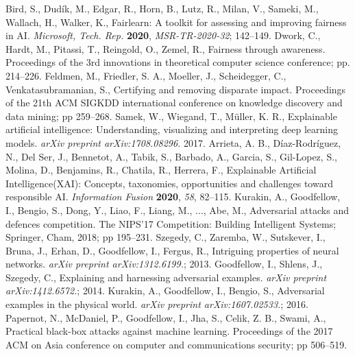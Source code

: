 \documentclass[journal,article,submit,moreauthors,pdftex]{Definitions/mdpi}
\begin{document}
\begin{thebibliography}{999}
Bird, S., Dudík, M., Edgar, R., Horn, B., Lutz, R., Milan, V., Sameki, M., Wallach, H., Walker, K., Fairlearn: A toolkit for assessing and improving fairness in AI. {\em Microsoft, Tech. Rep.} {\bf 2020}, {\em MSR-TR-2020-32}; 142--149.
Dwork, C., Hardt, M., Pitassi, T., Reingold, O., Zemel, R., Fairness through awareness. Proceedings of the 3rd innovations in theoretical computer science conference; pp. 214--226.
Feldmen, M., Friedler, S. A., Moeller, J., Scheidegger, C., Venkatasubramanian, S., Certifying and removing disparate impact. Proceedings of the 21th ACM SIGKDD international conference on knowledge discovery and data mining; pp 259--268.
Samek, W., Wiegand, T., Müller, K. R., Explainable artificial intelligence: Understanding, visualizing and interpreting deep learning models. \textit{arXiv preprint arXiv:1708.08296.} 2017.
Arrieta, A. B., Díaz-Rodríguez, N., Del Ser, J., Bennetot, A., Tabik, S., Barbado, A., Garcia, S., Gil-Lopez, S., Molina, D., Benjamins, R., Chatila, R., Herrera, F., Explainable Artificial Intelligence(XAI): Concepts, taxonomies, opportunities and challenges toward responsible AI. {\em Information Fusion} {\bf 2020}, {\em 58}, 82--115.
Kurakin, A., Goodfellow, I., Bengio, S., Dong, Y., Liao, F., Liang, M., ..., Abe, M., Adversarial attacks and defences competition. The NIPS'17 Competition: Building Intelligent Systems; Springer, Cham, 2018; pp 195--231.
Szegedy, C., Zaremba, W., Sutskever, I., Bruna, J., Erhan, D., Goodfellow, I., Fergus, R., Intriguing properties of neural networks. \textit{arXiv preprint arXiv:1312.6199.}; 2013.
Goodfellow, I., Shlens, J., Szegedy, C., Explaining and harnessing adversarial examples. \textit{arXiv preprint arXiv:1412.6572.}; 2014.
Kurakin, A., Goodfellow, I., Bengio, S., Adversarial examples in the physical world. \textit{arXiv preprint arXiv:1607.02533.}; 2016.
Papernot, N., McDaniel, P., Goodfellow, I., Jha, S., Celik, Z. B., Swami, A., Practical black-box attacks against machine learning. Proceedings of the 2017 ACM on Asia conference on computer and communications security; pp 506--519.

\end{thebibliography}
\end{document}
